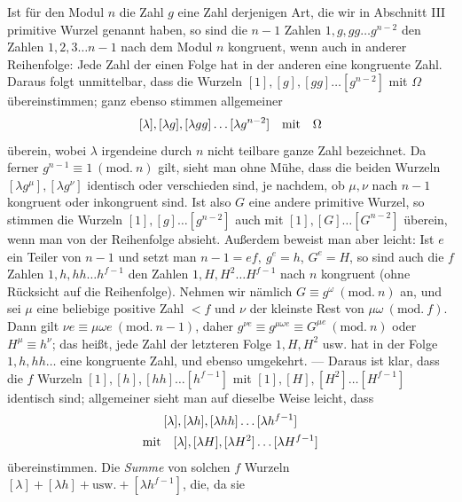 Ist für den Modul \(n\) die Zahl \(g\) eine Zahl derjenigen Art, die wir in Abschnitt III primitive Wurzel genannt haben, so sind die \(n-1\) Zahlen \(1,\allowbreak g,\allowbreak gg\ldots g^{n-2}\) den Zahlen \(1,\allowbreak 2,\allowbreak 3\ldots n-1\) nach dem Modul \(n\) kongruent, wenn auch in anderer Reihenfolge: Jede Zahl der einen Folge hat in der anderen eine kongruente Zahl. Daraus folgt unmittelbar, dass die Wurzeln \([1],\allowbreak [g],\allowbreak [gg]\ldots[g^{n-2}]\) mit \(\Omega\) übereinstimmen; ganz ebenso stimmen allgemeiner \[\relax[\lambda],[\lambda g],[\lambda gg]\ldots[\lambda g^{n-2}]\quad\text{mit}\quad\Omega\] überein, wobei \(\lambda\) irgendeine durch \(n\) nicht teilbare ganze Zahl bezeichnet. Da ferner \(g^{n-1}\equiv1\ (\mathrm{mod.}\ n)\) gilt, sieht man ohne Mühe, dass die beiden Wurzeln \([\lambda g^\mu],\allowbreak [\lambda g^\nu]\) identisch oder verschieden sind, je nachdem, ob \(\mu,\allowbreak \nu\) nach \(n-1\) kongruent oder inkongruent sind. Ist also \(G\) eine andere primitive Wurzel, so stimmen die Wurzeln \([1],\allowbreak [g]\ldots[g^{n-2}]\) auch mit \([1],\allowbreak [G]\ldots[G^{n-2}]\) überein, wenn man von der Reihenfolge absieht. Außerdem beweist man aber leicht: Ist \(e\) ein Teiler von \(n-1\) und setzt man \(n-1=ef,\allowbreak \ g^e=h\), \(G^e=H\), so sind auch die \(f\) Zahlen \(1,\allowbreak h,\allowbreak hh\ldots h^{f-1}\) den Zahlen \(1,\allowbreak H,\allowbreak H^2\ldots H^{f-1}\) nach \(n\) kongruent (ohne Rücksicht auf die Reihenfolge). Nehmen wir nämlich \(G\equiv g^\omega\ (\mathrm{mod.}\ n)\) an, und sei \(\mu\) eine beliebige positive Zahl \(<f\) und \(\nu\) der kleinste Rest von \(\mu\omega\ (\mathrm{mod.}\ f)\). Dann gilt \(\nu e\equiv\mu\omega e\ (\mathrm{mod.}\ n-1)\), daher \(g^{\nu e}\equiv g^{\mu\omega e}\equiv G^{\mu e}\ (\mathrm{mod.}\ n)\) oder \(H^\mu\equiv h^\nu\); das heißt, jede Zahl der letzteren Folge \(1,\allowbreak H,\allowbreak H^2\) usw. hat in der Folge \(1,\allowbreak h,\allowbreak hh\ldots\) eine kongruente Zahl, und ebenso umgekehrt. — Daraus ist klar, dass die \(f\) Wurzeln \([1],\allowbreak [h],\allowbreak [hh]\ldots[h^{f-1}]\) mit \([1],\allowbreak [H],\allowbreak [H^2]\ldots[H^{f-1}]\) identisch sind; allgemeiner sieht man auf dieselbe Weise leicht, dass \[\begin{gathered}
\relax[\lambda],[\lambda h],[\lambda hh]\ldots[\lambda h^{f-1}]\\
\text{mit}\quad[\lambda],[\lambda H],[\lambda H^2]\ldots[\lambda H^{f-1}]
\end{gathered}\] übereinstimmen. Die \textit{Summe} von solchen \(f\) Wurzeln \([\lambda]+[\lambda h]+\mathrm{usw.}+[\lambda h^{f-1}]\), die, da sie
